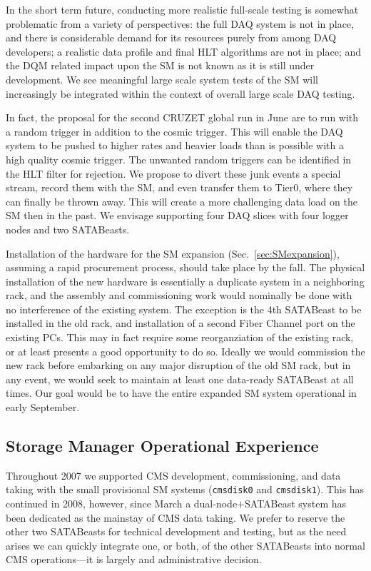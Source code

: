In the short term future, conducting more realistic full-scale testing
is somewhat problematic from a variety of perspectives: 
the full DAQ system is not in place, 
and there is considerable demand for its resources purely from among DAQ developers;
a realistic data profile and final HLT algorithms are not in place;
and the DQM related impact upon the SM is not known as it is still under development.
We see meaningful large scale system tests of the SM will increasingly be integrated
within the context of overall large scale DAQ testing.
 

In fact, the proposal for the second  CRUZET global run in June are to run with a random trigger 
in addition to the cosmic trigger.
This will enable the DAQ system to be pushed to higher rates and heavier loads than
is possible with a high quality cosmic trigger. 
The unwanted random triggers can be identified in the  HLT filter for rejection.
We propose to divert these junk events a special stream, record them with the SM,
and even transfer them to Tier0, where they can finally be thrown away.
This will create a more challenging data load on the SM then in the past.
We envisage supporting four DAQ slices with four logger nodes and two SATABeasts.



Installation of the hardware for the SM expansion (Sec.~\ref{sec:SMexpansion}), 
assuming a rapid procurement process, should take place by the fall.
The physical installation of the new hardware is essentially a duplicate
system in a neighboring rack, and the assembly and commissioning work
would nominally be done with no interference of the existing system.
The exception is the 4th SATABeast to be installed in the old rack,
and installation of a second Fiber Channel port on the existing PCs.
This may in fact require some reorganziation of the existing rack, 
or at least presents a good opportunity to do so.
Ideally we would commission the new rack before embarking on any major
disruption of the old SM rack, but in any event, we would seek to maintain
at least one data-ready SATABeast at all times.
Our goal would be to have the entire expanded SM system operational
in early September.


\subsection{\label{sec:SMexperience} Storage Manager Operational Experience}

Throughout 2007 we supported CMS development, commissioning, and data taking
with the small provisional SM systems (\verb+cmsdisk0+ and \verb+cmsdisk1+).
This has continued in 2008, however,
since March a dual-node$+$SATABeast system has been dedicated
as the mainstay of CMS data taking.
We prefer to reserve the other two SATABeasts for technical development
and testing, but as the need arises we can quickly integrate one, or both,
of the other SATABeasts into normal CMS operations---it is largely and 
administrative decision.

